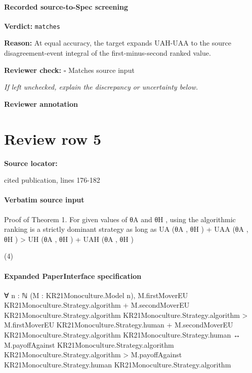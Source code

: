 \documentclass[10pt]{article}
\newcommand{\reviewerbox}{%
  \par\noindent\fbox{\parbox{0.96\linewidth}{\rule{0pt}{0.38in}}}\par
}
\newcommand{\reviewmatch}[1]{%
  \par\noindent\textbf{Reviewer check:} $\square$\; #1\par
  \noindent\emph{If left unchecked, explain the discrepancy or uncertainty below.}\par
}
\begin{document}
\paragraph{Recorded source-to-Spec screening}
\textbf{Verdict:} \texttt{matches}
\\
{\raggedright
\textbf{Reason:} At equal accuracy, the target expands UAH-\allowbreak{}UAA to the source disagreement-\allowbreak{}event integral of the first-\allowbreak{}minus-\allowbreak{}second ranked value.\allowbreak{}
\par}
\reviewmatch{Matches source input}
\noindent\textbf{Reviewer annotation}\par
\reviewerbox
\clearpage
\hypertarget{source-claim-ea5f4fa858fd5854}{}
\section*{Review row 5}
\textbf{Source locator:} {\footnotesize\raggedright cited publication, lines 176-\allowbreak{}182\par}
\paragraph{Verbatim source input}
\begin{ReviewVerbatim}
Proof of Theorem 1. For given values of θA and θH , using the algorithmic ranking is a strictly dominant
strategy as long as
UA (θA , θH ) + UAA (θA , θH ) > UH (θA , θH ) + UAH (θA , θH )

(4)
\end{ReviewVerbatim}



\paragraph{Expanded PaperInterface specification}
\begin{ReviewVerbatim}
∀ {n : ℕ} (M : KR21Monoculture.Model n),
  M.firstMoverEU KR21Monoculture.Strategy.algorithm +
        M.secondMoverEU KR21Monoculture.Strategy.algorithm KR21Monoculture.Strategy.algorithm >
      M.firstMoverEU KR21Monoculture.Strategy.human +
        M.secondMoverEU KR21Monoculture.Strategy.algorithm KR21Monoculture.Strategy.human ↔
    M.payoffAgainst KR21Monoculture.Strategy.algorithm KR21Monoculture.Strategy.algorithm >
      M.payoffAgainst KR21Monoculture.Strategy.human KR21Monoculture.Strategy.algorithm
\end{ReviewVerbatim}
\end{document}
